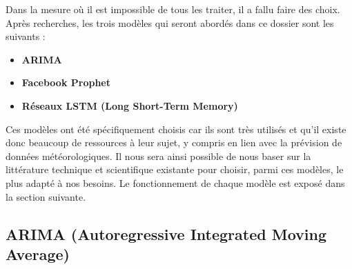 \documentclass[french]{article}
\begin{document}
    Dans la mesure où il est impossible de tous les traiter, il a fallu faire des choix. Après recherches, les trois modèles qui seront abordés dans ce dossier sont les suivants :
    \begin{itemize}
        \item \textbf{ARIMA}
        \item \textbf{Facebook Prophet}
        \item \textbf{Réseaux LSTM (Long Short-Term Memory)}
    \end{itemize} 
    
    Ces modèles ont été spécifiquement choisis car ils sont très utilisés et qu'il existe donc beaucoup de ressources à leur sujet, y compris en lien avec la prévision de données météorologiques\cite{chen, alsharif, karevan}. Il nous sera ainsi possible de nous baser sur la littérature technique et scientifique existante pour choisir, parmi ces modèles, le plus adapté à nos besoins. Le fonctionnement de chaque modèle est exposé dans la section suivante.

    \subsection{ARIMA (Autoregressive Integrated Moving Average)}
\end{document}
